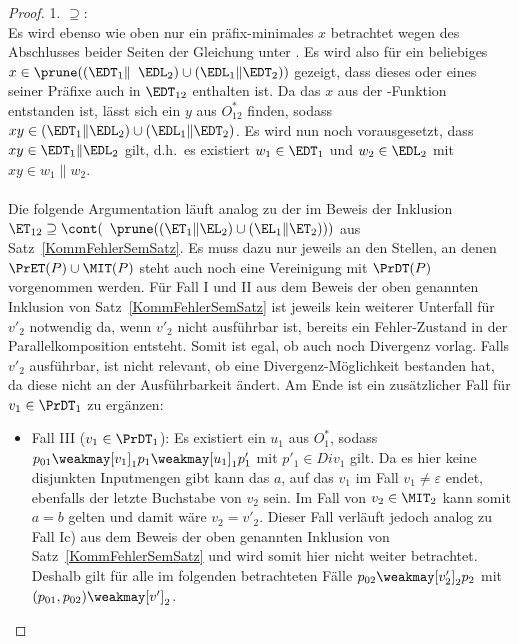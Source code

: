 \begin{proof}
  1. \glqq$\supseteq$\grqq{}:\\
  Es wird ebenso wie oben nur ein präfix-minimales $x$ betrachtet wegen des
  Abschlusses beider Seiten der Gleichung unter \cont{}. Es wird also für ein
  beliebiges $x\in\prune ((\EDT _1\|$ $\EDL _2)\cup (\EDL _1\|\EDT _2))$ gezeigt,
  dass dieses oder eines seiner Präfixe auch in $\EDT _{12}$ enthalten ist. Da
  das $x$ aus der \prune{}-Funktion entstanden ist, lässt sich ein $y$ aus
  $O^*_{12}$ finden, sodass $xy\in (\EDT _1\|\EDL _2)\cup (\EDL _1\|\EDT _2)$.
  Es wird nun noch vorausgesetzt, dass \oBdA{} $xy\in \EDT _1\|\EDL _2$ gilt,
  d.h.\ es existiert $w_1\in\EDT _1$ und $w_2\in\EDL _2$ mit $xy\in
  w_1\|w_2$.\\
  \\
  Die folgende Argumentation läuft analog zu der im Beweis der Inklusion $\ET
  _{12} \supseteq \cont($ $\prune ((\ET _1\|\EL _2)\cup (\EL _1\|\ET _2)))$ aus
  Satz~\ref{KommFehlerSemSatz}. Es muss dazu nur jeweils an den Stellen, an
  denen $\PrET (P)\cup\MIT (P)$ steht auch noch eine Vereinigung mit $\PrDT
  (P)$ vorgenommen werden. Für Fall I und II aus dem Beweis der oben genannten
  Inklusion von Satz~\ref{KommFehlerSemSatz} ist jeweils kein weiterer
  Unterfall für $v'_2$ notwendig da, wenn $v'_2$ nicht ausführbar ist, bereits
  ein Fehler-Zustand in der Parallelkomposition
  entsteht. Somit ist egal, ob auch noch Divergenz vorlag. Falls $v'_2$
  ausführbar, ist nicht relevant, ob eine Divergenz-Möglichkeit bestanden hat,
  da diese nicht an der Ausführbarkeit ändert. Am Ende ist ein zusätzlicher
  Fall für $v_1\in\PrDT _1$ zu ergänzen:
  \begin{itemize}
    \item Fall III ($v_1\in\PrDT _1$): Es existiert ein $u_1$ aus $O^*_1$,
      sodass $p_{01}\weakmay[v_1]_1 p_1\weakmay[u_1]_1 p'_1$ mit $p'_1\in Div
      _1$ gilt. Da es hier keine disjunkten Inputmengen gibt kann das $a$, auf das $v_1$
      im Fall $v_1\neq\varepsilon$ endet, ebenfalls der letzte Buchstabe von $v_2$
      sein. Im Fall von $v_2\in\MIT _2$ kann somit $a=b$ gelten und damit wäre
      $v_2=v'_2$. Dieser Fall verläuft jedoch analog zu Fall Ic) aus dem Beweis
     der oben genannten Inklusion von Satz~\ref{KommFehlerSemSatz} und wird
      somit hier nicht weiter betrachtet. Deshalb gilt für alle im folgenden
      betrachteten Fälle $p_{02}\weakmay[v'_2]_2 p_2$ mit $(p_{01},p_{02})
      \weakmay[v']_2$.
      \begin{itemize}

\end{itemize}
\end{itemize}
\end{proof}
